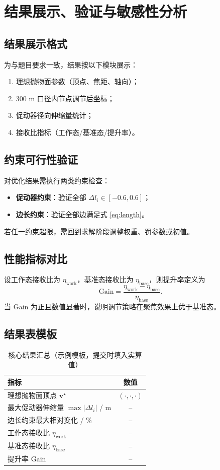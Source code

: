\chapter{结果展示、验证与敏感性分析}

\section{结果展示格式}
为与题目要求一致，结果按以下模块展示：
\begin{enumerate}
  \item 理想抛物面参数（顶点、焦距、轴向）；
  \item 300 m 口径内节点调节后坐标；
  \item 促动器径向伸缩量统计；
  \item 接收比指标（工作态/基准态/提升率）。
\end{enumerate}

\section{约束可行性验证}
对优化结果需执行两类约束检查：
\begin{itemize}
  \item \textbf{促动器约束}：验证全部 $\Delta l_i\in[-0.6,0.6]$；
  \item \textbf{边长约束}：验证全部边满足式 \eqref{eq:length}。
\end{itemize}
若任一约束超限，需回到求解阶段调整权重、罚参数或初值。

\section{性能指标对比}
设工作态接收比为 $\eta_{\text{work}}$，基准态接收比为 $\eta_{\text{base}}$，则提升率定义为
\[
\text{Gain}=\frac{\eta_{\text{work}}-\eta_{\text{base}}}{\eta_{\text{base}}}.
\]
当 Gain 为正且数值显著时，说明调节策略在聚焦效果上优于基准态。

\section{结果表模板}
\begin{table}[H]
\centering
\caption{核心结果汇总（示例模板，提交时填入实算值）}
\begin{tabular}{lc}
\toprule
指标 & 数值 \\
\midrule
理想抛物面顶点 $\mathbf v^\star$ & $(\cdot,\cdot,\cdot)$ \\
最大促动器伸缩量 $\max|\Delta l_i|$ / m & -- \\
边长约束最大相对变化 / \% & -- \\
工作态接收比 $\eta_{\text{work}}$ & -- \\
基准态接收比 $\eta_{\text{base}}$ & -- \\
提升率 Gain & -- \\
\bottomrule
\end{tabular}
\end{table}

